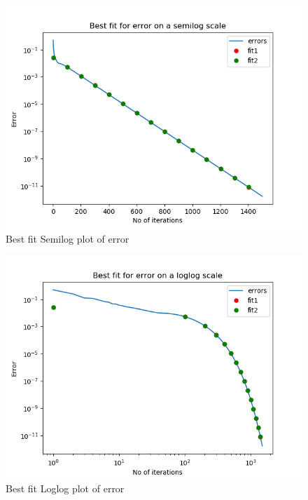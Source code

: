 \documentclass{article}
\begin{document}
\begin{figure}[h!]
\centering
\includegraphics[scale=0.7]{Figure_4_5.png}
\caption{Best fit Semilog plot of error}
\label{Best fit Semilog plot of error}
\end{figure}


\begin{figure}[h!]
\centering
\includegraphics[scale=0.5]{Figure_5_5.png}
\caption{Best fit Loglog plot of error}
\label{Best fit Loglog plot of error}
\end{figure}
\end{document}

